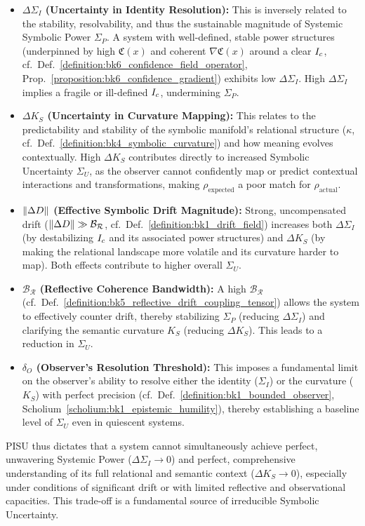 \begin{itemize}
    \item \textbf{\(\Delta\Sigma_I\) (Uncertainty in Identity Resolution):} This is inversely related to the stability, resolvability, and thus the sustainable magnitude of Systemic Symbolic Power \(\Sigma_P\). A system with well-defined, stable power structures (underpinned by high \(\mathfrak{C}(x)\) and coherent \(\nabla \mathfrak{C}(x)\) around a clear \(I_c\), cf.~Def.~\ref{definition:bk6_confidence_field_operator}, Prop.~\ref{proposition:bk6_confidence_gradient}) exhibits low \(\Delta\Sigma_I\). High \(\Delta\Sigma_I\) implies a fragile or ill-defined \(I_c\), undermining \(\Sigma_P\).
    \item \textbf{\(\Delta K_S\) (Uncertainty in Curvature Mapping):} This relates to the predictability and stability of the symbolic manifold's relational structure (\(\kappa\), cf.~Def.~\ref{definition:bk4_symbolic_curvature}) and how meaning evolves contextually. High \(\Delta K_S\) contributes directly to increased Symbolic Uncertainty \(\Sigma_U\), as the observer cannot confidently map or predict contextual interactions and transformations, making \(\rho_{\text{expected}}\) a poor match for \(\rho_{\text{actual}}\).
    \item \textbf{\(\|\Delta D\|\) (Effective Symbolic Drift Magnitude):} Strong, uncompensated drift (\(\|\Delta D\| \gg \mathcal{B_R}\), cf.~Def.~\ref{definition:bk1_drift_field}) increases both \(\Delta\Sigma_I\) (by destabilizing \(I_c\) and its associated power structures) and \(\Delta K_S\) (by making the relational landscape more volatile and its curvature harder to map). Both effects contribute to higher overall \(\Sigma_U\).
    \item \textbf{\(\mathcal{B_R}\) (Reflective Coherence Bandwidth):} A high \(\mathcal{B_R}\) (cf.~Def.~\ref{definition:bk5_reflective_drift_coupling_tensor}) allows the system to effectively counter drift, thereby stabilizing \(\Sigma_P\) (reducing \(\Delta\Sigma_I\)) and clarifying the semantic curvature \(K_S\) (reducing \(\Delta K_S\)). This leads to a reduction in \(\Sigma_U\).
    \item \textbf{\(\delta_O\) (Observer's Resolution Threshold):} This imposes a fundamental limit on the observer's ability to resolve either the identity (\(\Sigma_I\)) or the curvature (\(K_S\)) with perfect precision (cf.~Def.~\ref{definition:bk1_bounded_observer}, Scholium~\ref{scholium:bk1_epistemic_humility}), thereby establishing a baseline level of \(\Sigma_U\) even in quiescent systems.
\end{itemize}
PISU thus dictates that a system cannot simultaneously achieve perfect, unwavering Systemic Power (\(\Delta\Sigma_I \to 0\)) and perfect, comprehensive understanding of its full relational and semantic context (\(\Delta K_S \to 0\)), especially under conditions of significant drift or with limited reflective and observational capacities. This trade-off is a fundamental source of irreducible Symbolic Uncertainty.

